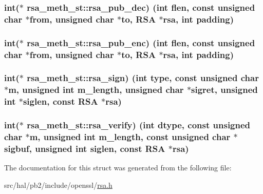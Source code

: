 \subsubsection[{\texorpdfstring{rsa\+\_\+pub\+\_\+dec}{rsa_pub_dec}}]{\setlength{\rightskip}{0pt plus 5cm}int($\ast$ rsa\+\_\+meth\+\_\+st\+::rsa\+\_\+pub\+\_\+dec) (int flen, const unsigned char $\ast$from, unsigned char $\ast$to, {\bf R\+SA} $\ast$rsa, int padding)}\hypertarget{structrsa__meth__st_a4eb63fb1e1abbe10f8cd81c1efef8cf4}{}\label{structrsa__meth__st_a4eb63fb1e1abbe10f8cd81c1efef8cf4}
\subsubsection[{\texorpdfstring{rsa\+\_\+pub\+\_\+enc}{rsa_pub_enc}}]{\setlength{\rightskip}{0pt plus 5cm}int($\ast$ rsa\+\_\+meth\+\_\+st\+::rsa\+\_\+pub\+\_\+enc) (int flen, const unsigned char $\ast$from, unsigned char $\ast$to, {\bf R\+SA} $\ast$rsa, int padding)}\hypertarget{structrsa__meth__st_a6ff51f7f2fd9b5b7e16a30616301caa7}{}\label{structrsa__meth__st_a6ff51f7f2fd9b5b7e16a30616301caa7}
\subsubsection[{\texorpdfstring{rsa\+\_\+sign}{rsa_sign}}]{\setlength{\rightskip}{0pt plus 5cm}int($\ast$ rsa\+\_\+meth\+\_\+st\+::rsa\+\_\+sign) (int {\bf type}, const unsigned char $\ast$m, unsigned int m\+\_\+length, unsigned char $\ast$sigret, unsigned int $\ast$siglen, const {\bf R\+SA} $\ast$rsa)}\hypertarget{structrsa__meth__st_a9417375cd40a1ebef8631897593212e5}{}\label{structrsa__meth__st_a9417375cd40a1ebef8631897593212e5}
\subsubsection[{\texorpdfstring{rsa\+\_\+verify}{rsa_verify}}]{\setlength{\rightskip}{0pt plus 5cm}int($\ast$ rsa\+\_\+meth\+\_\+st\+::rsa\+\_\+verify) (int dtype, const unsigned char $\ast$m, unsigned int m\+\_\+length, const unsigned char $\ast$sigbuf, unsigned int siglen, const {\bf R\+SA} $\ast$rsa)}\hypertarget{structrsa__meth__st_a9a5b98e6b902fd0a31b0663b91460627}{}\label{structrsa__meth__st_a9a5b98e6b902fd0a31b0663b91460627}


The documentation for this struct was generated from the following file\+:\begin{DoxyCompactItemize}
\item 
src/hal/pb2/include/openssl/\hyperlink{rsa_8h}{rsa.\+h}\end{DoxyCompactItemize}
